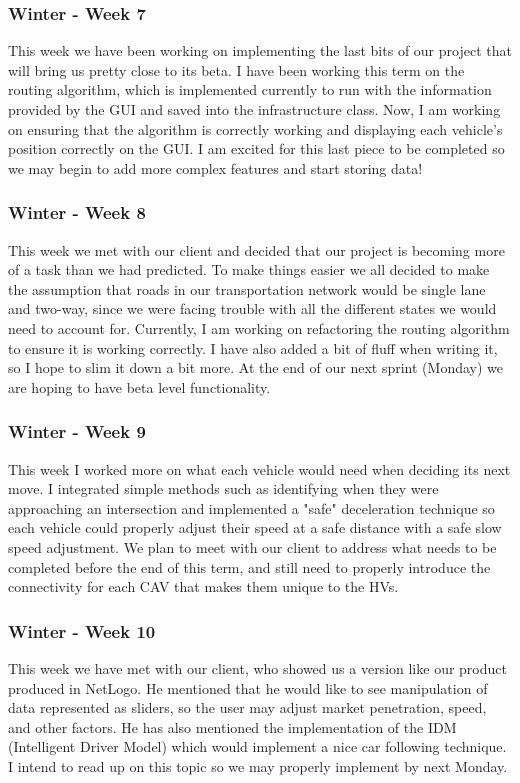 \documentclass[onecolumn, draftclsnofoot,10pt, compsoc]{IEEEtran}
\begin{document}
\subsubsection{Winter - Week 7}
This week we have been working on implementing the last bits of our project that will bring us pretty close to its beta.
I have been working this term on the routing algorithm, which is implemented currently to run with the information provided by the GUI and saved into the infrastructure class.
Now, I am working on ensuring that the algorithm is correctly working and displaying each vehicle's position correctly on the GUI.
I am excited for this last piece to be completed so we may begin to add more complex features and start storing data!
\subsubsection{Winter - Week 8}
This week we met with our client and decided that our project is becoming more of a task than we had predicted.
To make things easier we all decided to make the assumption that roads in our transportation network would be single lane and two-way, since we were facing trouble with all the different states we would need to account for.
Currently, I am working on refactoring the routing algorithm to ensure it is working correctly.
I have also added a bit of fluff when writing it, so I hope to slim it down a bit more.
At the end of our next sprint (Monday) we are hoping to have beta level functionality.
\subsubsection{Winter - Week 9}
This week I worked more on what each vehicle would need when deciding its next move.
I integrated simple methods such as identifying when they were approaching an intersection and implemented a "safe" deceleration technique so each vehicle could properly adjust their speed at a safe distance with a safe slow speed adjustment.
We plan to meet with our client to address what needs to be completed before the end of this term, and still need to properly introduce the connectivity for each CAV that makes them unique to the HVs.
\subsubsection{Winter - Week 10}
This week we have met with our client, who showed us a version like our product produced in NetLogo.
He mentioned that he would like to see manipulation of data represented as sliders, so the user may adjust market penetration, speed, and other factors.
He has also mentioned the implementation of the IDM (Intelligent Driver Model) which would implement a nice car following technique.
I intend to read up on this topic so we may properly implement by next Monday.
\end{document}
